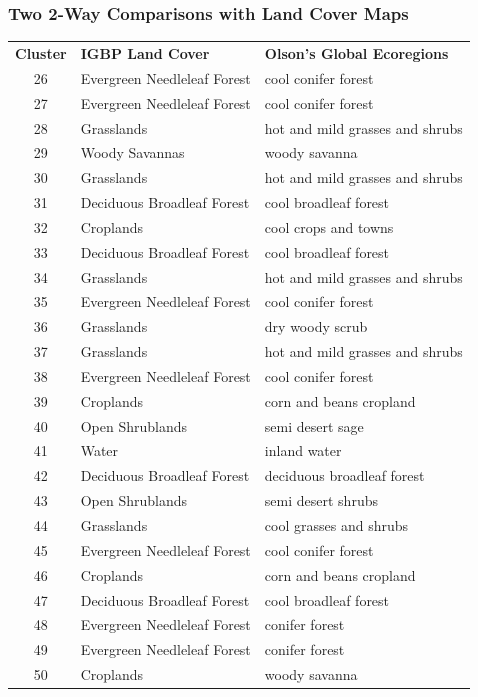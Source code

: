 \begin{frame}
   \frametitle{Two 2-Way Comparisons with Land Cover Maps}
   \tiny 
    \begin{tabular}{cll}
      \textbf{Cluster} & \textbf{IGBP Land Cover} & \textbf{Olson's Global Ecoregions} \\
26 & Evergreen Needleleaf Forest & cool conifer forest \\
27 & Evergreen Needleleaf Forest & cool conifer forest \\
28 & Grasslands & hot and mild grasses and shrubs \\
29 & Woody Savannas & woody savanna \\
30 & Grasslands & hot and mild grasses and shrubs \\
31 & Deciduous Broadleaf Forest & cool broadleaf forest \\
32 & Croplands & cool crops and towns \\
33 & Deciduous Broadleaf Forest & cool broadleaf forest \\
34 & Grasslands & hot and mild grasses and shrubs \\
35 & Evergreen Needleleaf Forest & cool conifer forest \\
36 & Grasslands & dry woody scrub \\
37 & Grasslands & hot and mild grasses and shrubs \\
38 & Evergreen Needleleaf Forest & cool conifer forest \\
39 & Croplands & corn and beans cropland \\
40 & Open Shrublands & semi desert sage \\
41 & Water & inland water \\
42 & Deciduous Broadleaf Forest & deciduous broadleaf forest \\
43 & Open Shrublands & semi desert shrubs \\
44 & Grasslands & cool grasses and shrubs \\
45 & Evergreen Needleleaf Forest & cool conifer forest \\
46 & Croplands & corn and beans cropland \\
47 & Deciduous Broadleaf Forest & cool broadleaf forest \\
48 & Evergreen Needleleaf Forest & conifer forest \\
49 & Evergreen Needleleaf Forest & conifer forest \\
50 & Croplands & woody savanna \\
\end{tabular}
\end{frame}

